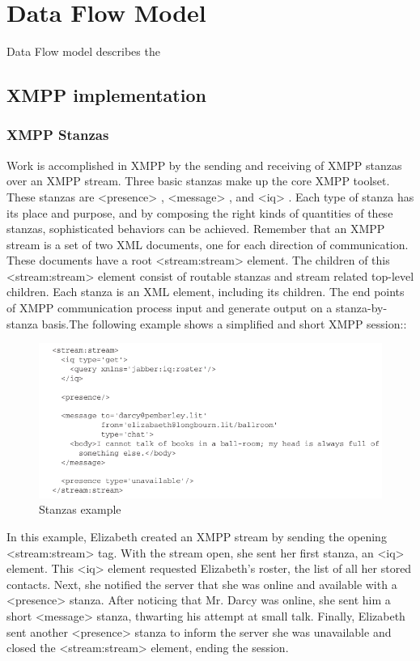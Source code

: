 \section{Data Flow Model}
Data Flow model describes the 
	\subsection{XMPP implementation}
	\subsubsection{XMPP Stanzas}
	Work is accomplished in XMPP by the sending and receiving of XMPP stanzas over an XMPP stream. Three basic stanzas make up the core XMPP toolset. These stanzas are <presence> , <message> , and <iq> . Each type of stanza has its place and purpose, and by composing the right kinds of quantities of these stanzas, sophisticated behaviors can be achieved. Remember that an XMPP stream is a set of two XML documents, one for each direction of communication. These documents have a root <stream:stream> element. The children of this <stream:stream> element consist of routable stanzas and stream related top-level children. Each stanza is an XML element, including its children. The end points of XMPP communication process input and generate output on a stanza-by-stanza basis.The following example shows a simplified and short XMPP session::
		\begin{figure}[!ht]
		\centering
		\includegraphics[scale=0.9]{images/Stanzas.png}   
		\caption[Stanzas example]{Stanzas example}
		\label{img:interfaces}                           
		\end{figure}
		In this example, Elizabeth created an XMPP stream by sending the opening <stream:stream> tag. With the stream open, she sent her first stanza, an <iq> element. This <iq> element requested Elizabeth’s roster, the list of all her stored contacts. Next, she notified the server that she was online and available with a <presence> stanza. After noticing that Mr. Darcy was online, she sent him a short <message> stanza, thwarting his attempt at small talk. Finally, Elizabeth sent another <presence> stanza to inform the server she was unavailable and closed the <stream:stream> element, ending the session.
    
